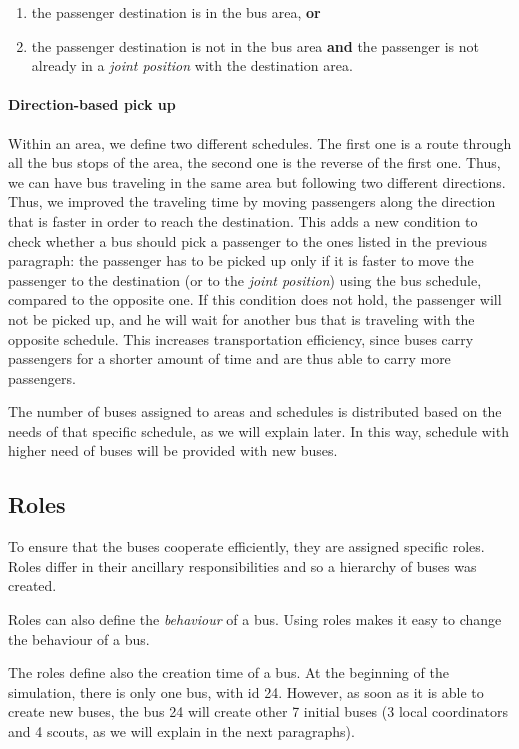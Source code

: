 \begin{enumerate}
\item the passenger destination is in the bus area, \textbf{or}
\item the passenger destination is not in the bus area \textbf{and} the passenger is not already in a \textit{joint position} with the destination area.
\end{enumerate}

\paragraph{Direction-based pick up}

Within an area, we define two different schedules. The first one is a route through all the bus stops of the area, the second one is the reverse of the first one. Thus, we can have bus traveling in the same area but following two different directions. Thus, we improved the traveling time by moving passengers along the direction that is faster in order to reach the destination. This adds a new condition to check whether a bus should pick a passenger to the ones listed in the previous paragraph: the passenger has to be picked up only if it is faster to move the passenger to the destination (or to the \textit{joint position}) using the bus schedule, compared to the opposite one. If this condition does not hold, the passenger will not be picked up, and he will wait for another bus that is traveling with the opposite schedule. This increases transportation efficiency, since buses carry passengers for a shorter amount of time and are thus able to carry more passengers. 

The number of buses assigned to areas and schedules is distributed based on the needs of that specific schedule, as we will explain later. In this way, schedule with higher need of buses will be provided with new buses.

\subsection{Roles}
\label{subsec:roles}

To ensure that the buses cooperate efficiently, they are assigned specific roles. Roles differ in their ancillary responsibilities and so a hierarchy of buses was created. 

Roles can also define the \textit{behaviour} of a bus. Using roles makes it easy to change the behaviour of a bus.

The roles define also the creation time of a bus. At the beginning of the simulation, there is only one bus, with id 24. However, as soon as it is able to create new buses, the bus 24 will create other 7 initial buses (3 local coordinators and 4 scouts, as we will explain in the next paragraphs).

